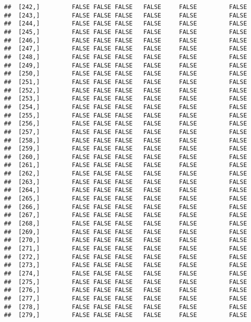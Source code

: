 \documentclass[
]{article}
\begin{document}
\begin{verbatim}
##  [242,]         FALSE FALSE FALSE   FALSE     FALSE         FALSE
##  [243,]         FALSE FALSE FALSE   FALSE     FALSE         FALSE
##  [244,]         FALSE FALSE FALSE   FALSE     FALSE         FALSE
##  [245,]         FALSE FALSE FALSE   FALSE     FALSE         FALSE
##  [246,]         FALSE FALSE FALSE   FALSE     FALSE         FALSE
##  [247,]         FALSE FALSE FALSE   FALSE     FALSE         FALSE
##  [248,]         FALSE FALSE FALSE   FALSE     FALSE         FALSE
##  [249,]         FALSE FALSE FALSE   FALSE     FALSE         FALSE
##  [250,]         FALSE FALSE FALSE   FALSE     FALSE         FALSE
##  [251,]         FALSE FALSE FALSE   FALSE     FALSE         FALSE
##  [252,]         FALSE FALSE FALSE   FALSE     FALSE         FALSE
##  [253,]         FALSE FALSE FALSE   FALSE     FALSE         FALSE
##  [254,]         FALSE FALSE FALSE   FALSE     FALSE         FALSE
##  [255,]         FALSE FALSE FALSE   FALSE     FALSE         FALSE
##  [256,]         FALSE FALSE FALSE   FALSE     FALSE         FALSE
##  [257,]         FALSE FALSE FALSE   FALSE     FALSE         FALSE
##  [258,]         FALSE FALSE FALSE   FALSE     FALSE         FALSE
##  [259,]         FALSE FALSE FALSE   FALSE     FALSE         FALSE
##  [260,]         FALSE FALSE FALSE   FALSE     FALSE         FALSE
##  [261,]         FALSE FALSE FALSE   FALSE     FALSE         FALSE
##  [262,]         FALSE FALSE FALSE   FALSE     FALSE         FALSE
##  [263,]         FALSE FALSE FALSE   FALSE     FALSE         FALSE
##  [264,]         FALSE FALSE FALSE   FALSE     FALSE         FALSE
##  [265,]         FALSE FALSE FALSE   FALSE     FALSE         FALSE
##  [266,]         FALSE FALSE FALSE   FALSE     FALSE         FALSE
##  [267,]         FALSE FALSE FALSE   FALSE     FALSE         FALSE
##  [268,]         FALSE FALSE FALSE   FALSE     FALSE         FALSE
##  [269,]         FALSE FALSE FALSE   FALSE     FALSE         FALSE
##  [270,]         FALSE FALSE FALSE   FALSE     FALSE         FALSE
##  [271,]         FALSE FALSE FALSE   FALSE     FALSE         FALSE
##  [272,]         FALSE FALSE FALSE   FALSE     FALSE         FALSE
##  [273,]         FALSE FALSE FALSE   FALSE     FALSE         FALSE
##  [274,]         FALSE FALSE FALSE   FALSE     FALSE         FALSE
##  [275,]         FALSE FALSE FALSE   FALSE     FALSE         FALSE
##  [276,]         FALSE FALSE FALSE   FALSE     FALSE         FALSE
##  [277,]         FALSE FALSE FALSE   FALSE     FALSE         FALSE
##  [278,]         FALSE FALSE FALSE   FALSE     FALSE         FALSE
##  [279,]         FALSE FALSE FALSE   FALSE     FALSE         FALSE

\end{verbatim}
\end{document}
